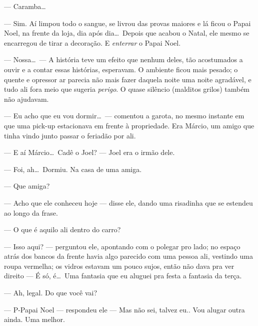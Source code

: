 --- Caramba\ldots

--- Sim. Aí limpou todo o sangue, se livrou das provas maiores e lá ficou o Papai Noel, na frente da loja, dia após dia\ldots \ Depois que acabou o Natal, ele mesmo se encarregou de tirar a decoração. E \emph{enterrar} o Papai Noel.

--- Nossa\ldots \ --- A história teve um efeito que nenhum deles, tão acostumados a ouvir e a contar essas histórias, esperavam. O ambiente ficou mais pesado; o quente e opressor ar parecia não mais fazer daquela noite uma noite agradável, e tudo ali fora meio que sugeria \emph{perigo}. O quase silêncio (malditos grilos) também não ajudavam.

--- Eu acho que eu vou dormir\ldots \ --- comentou a garota, no mesmo instante em que uma pick-up estacionava em frente à propriedade. Era Márcio, um amigo que tinha vindo junto passar o feriadão por ali.

--- E aí Márcio\ldots \ Cadê o Joel? --- Joel era o irmão dele.

--- Foi, ah\ldots \ Dormiu. Na casa de uma amiga.

--- Que amiga?

--- Acho que ele conheceu hoje --- disse ele, dando uma risadinha que se estendeu ao longo da frase.

--- O que é aquilo ali dentro do carro?

--- Isso aqui? --- perguntou ele, apontando com o polegar pro lado; no espaço atrás dos bancos da frente havia algo parecido com uma pessoa ali, vestindo uma roupa vermelha; os vidros estavam um pouco sujos, então não dava pra ver direito --- É só, é\ldots \ Uma fantasia que eu aluguei pra festa a fantasia da terça.

--- Ah, legal. Do que você vai?

--- P-Papai Noel --- respondeu ele --- Mas não sei, talvez eu.. Vou alugar outra ainda. Uma melhor.
